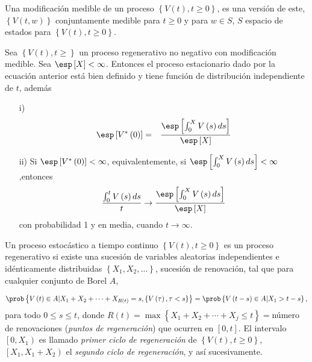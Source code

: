 \begin{Def}
Una modificaci\'on medible de un proceso $\left\{V\left(t\right),t\geq0\right\}$, es una versi\'on de este, $\left\{V\left(t,w\right)\right\}$ conjuntamente medible para $t\geq0$ y para $w\in S$, $S$ espacio de estados para $\left\{V\left(t\right),t\geq0\right\}$.
\end{Def}

\begin{Teo}
Sea $\left\{V\left(t\right),t\geq\right\}$ un proceso regenerativo no negativo con modificaci\'on medible. Sea $\esp\left[X\right]<\infty$. Entonces el proceso estacionario dado por la ecuaci\'on anterior est\'a bien definido y tiene funci\'on de distribuci\'on independiente de $t$, adem\'as
\begin{itemize}
\item[i)] \begin{eqnarray*}
\esp\left[V^{*}\left(0\right)\right]&=&\frac{\esp\left[\int_{0}^{X}V\left(s\right)ds\right]}{\esp\left[X\right]}\end{eqnarray*}
\item[ii)] Si $\esp\left[V^{*}\left(0\right)\right]<\infty$, equivalentemente, si $\esp\left[\int_{0}^{X}V\left(s\right)ds\right]<\infty$,entonces
\begin{eqnarray*}
\frac{\int_{0}^{t}V\left(s\right)ds}{t}\rightarrow\frac{\esp\left[\int_{0}^{X}V\left(s\right)ds\right]}{\esp\left[X\right]}
\end{eqnarray*}
con probabilidad 1 y en media, cuando $t\rightarrow\infty$.
\end{itemize}
\end{Teo}



Un proceso estoc\'astico a tiempo continuo $\left\{V\left(t\right),t\geq0\right\}$ es un proceso regenerativo si existe una sucesi\'on de variables aleatorias independientes e id\'enticamente distribuidas $\left\{X_{1},X_{2},\ldots\right\}$, sucesi\'on de renovaci\'on, tal que para cualquier conjunto de Borel $A$, 

\begin{eqnarray*}
\prob\left\{V\left(t\right)\in A|X_{1}+X_{2}+\cdots+X_{R\left(t\right)}=s,\left\{V\left(\tau\right),\tau<s\right\}\right\}=\prob\left\{V\left(t-s\right)\in A|X_{1}>t-s\right\},
\end{eqnarray*}
para todo $0\leq s\leq t$, donde $R\left(t\right)=\max\left\{X_{1}+X_{2}+\cdots+X_{j}\leq t\right\}=$n\'umero de renovaciones ({\emph{puntos de regeneraci\'on}}) que ocurren en $\left[0,t\right]$. El intervalo $\left[0,X_{1}\right)$ es llamado {\emph{primer ciclo de regeneraci\'on}} de $\left\{V\left(t \right),t\geq0\right\}$, $\left[X_{1},X_{1}+X_{2}\right)$ el {\emph{segundo ciclo de regeneraci\'on}}, y as\'i sucesivamente.

